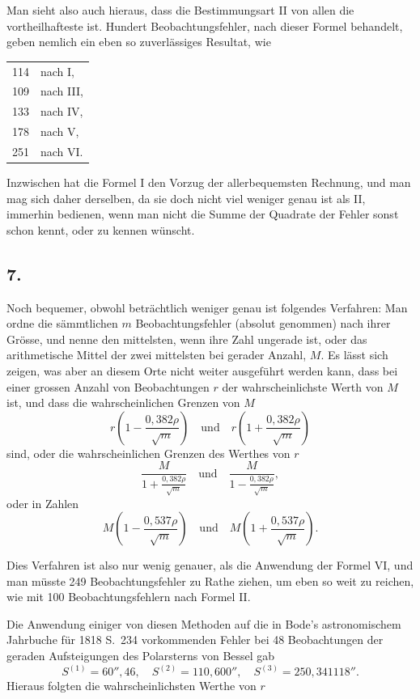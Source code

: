 \documentclass[12pt,a4paper]{article}
\begin{document}
\bigskip
\noindent
Man sieht also auch hieraus, dass die Bestimmungsart II von allen die vortheilhafteste ist. Hundert Beobachtungsfehler, nach dieser Formel behandelt, geben nemlich ein eben so zuverl\"assiges Resultat, wie
\begin{center}
\begin{tabular}{rl}
114 & nach I, \\
109 & nach III, \\
133 & nach IV, \\
178 & nach V, \\
251 & nach VI.
\end{tabular}
\end{center}

\noindent
Inzwischen hat die Formel I den Vorzug der allerbequemsten Rechnung, und man mag sich daher derselben, da sie doch nicht viel weniger genau ist als II, immerhin bedienen, wenn man nicht die Summe der Quadrate der Fehler sonst schon kennt, oder zu kennen w\"unscht.

\subsection*{7.}

Noch bequemer, obwohl betr\"achtlich weniger genau ist folgendes Verfahren: Man ordne die s\"ammtlichen $m$ Beobachtungsfehler (absolut genommen) nach ihrer Gr\"osse, und nenne den mittelsten, wenn ihre Zahl ungerade ist, oder das arithmetische Mittel der zwei mittelsten bei gerader Anzahl, $M$. Es l\"asst sich zeigen, was aber an diesem Orte nicht weiter ausgef\"uhrt werden kann, dass bei einer grossen Anzahl von Beobachtungen $r$ der wahrscheinlichste Werth von $M$ ist, und dass die wahrscheinlichen Grenzen von $M$
\[
r\left(1 - \frac{0{,}382\rho}{\sqrt{m}}\right) \quad\text{und}\quad r\left(1 + \frac{0{,}382\rho}{\sqrt{m}}\right)
\]
sind, oder die wahrscheinlichen Grenzen des Werthes von $r$
\[
\frac{M}{1 + \frac{0{,}382\rho}{\sqrt{m}}} \quad\text{und}\quad \frac{M}{1 - \frac{0{,}382\rho}{\sqrt{m}}},
\]
oder in Zahlen
\[
M\left(1 - \frac{0{,}537\rho}{\sqrt{m}}\right) \quad\text{und}\quad M\left(1 + \frac{0{,}537\rho}{\sqrt{m}}\right).
\]

Dies Verfahren ist also nur wenig genauer, als die Anwendung der Formel VI, und man m\"usste 249 Beobachtungsfehler zu Rathe ziehen, um eben so weit zu reichen, wie mit 100 Beobachtungsfehlern nach Formel II.

Die Anwendung einiger von diesen Methoden auf die in Bode's astronomischem Jahrbuche f\"ur 1818 S.\ 234 vorkommenden Fehler bei 48 Beobachtungen der geraden Aufsteigungen des Polarsterns von Bessel gab
\[
S^{(1)} = 60''{,}46, \quad S^{(2)} = 110{,}600'', \quad S^{(3)} = 250{,}341118''.
\]
Hieraus folgten die wahrscheinlichsten Werthe von $r$
\end{document}
